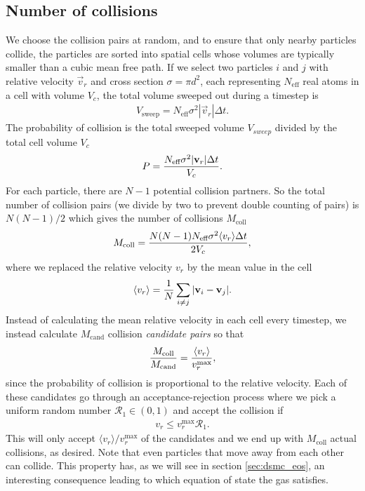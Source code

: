 \subsection{Number of collisions}
We choose the collision pairs at random, and to ensure that only nearby particles collide, the particles are sorted into spatial cells whose volumes are typically smaller than a cubic mean free path. If we select two particles $i$ and $j$ with relative velocity $\vec v_r$ and cross section $\sigma=\pi d^2$, each representing $N_\text{eff}$ real atoms in a cell with volume $V_c$, the total volume sweeped out during a timestep is
\begin{align}
	V_\text{sweep} = N_\text{eff}\sigma^2|\vec v_r|\Delta t.
\end{align}
The probability of collision is the total sweeped volume $V_{sweep}$ divided by the total cell volume $V_c$
\begin{align}
	P = {N_\text{eff}\sigma^2|\vec v_r|\Delta t \over V_c}.
\end{align}
For each particle, there are $N-1$ potential collision partners. So the total number of collision pairs (we divide by two to prevent double counting of pairs) is $N(N-1)/2$ which gives the number of collisions $M_\text{coll}$
\begin{align}
	M_\text{coll} = {N(N-1)N_\text{eff}\sigma^2\langle v_r \rangle \Delta t\over 2 V_c},
\end{align}
where we replaced the relative velocity $v_r$ by the mean value in the cell
\begin{align}
	\langle v_r \rangle = {1\over N} \sum_{i\neq j} |\vec v_i - \vec v_j|.
\end{align}
Instead of calculating the mean relative velocity in each cell every timestep, we instead calculate $M_\text{cand}$ collision \textit{candidate pairs} so that
\begin{align}
	{M_\text{coll}\over M_\text{cand}} = {\langle v_r\rangle \over v_r^\text{max}},
\end{align}
since the probability of collision is proportional to the relative velocity. Each of these candidates go through an acceptance-rejection process where we pick a uniform random number $\mathcal{R}_1\in (0,1)$ and accept the collision if
\begin{align}
	v_r \leq v_r^\text{max}\mathcal{R}_1.
\end{align}
This will only accept $\langle v_r\rangle/v_r^\text{max}$ of the candidates and we end up with $M_\text{coll}$ actual collisions, as desired. Note that even particles that move away from each other can collide. This property has, as we will see in section \ref{sec:dsmc_eos}, an interesting consequence leading to which equation of state the gas satisfies.
